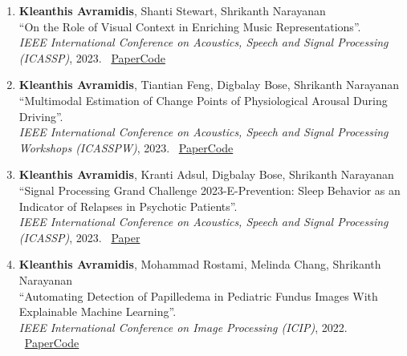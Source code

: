 \documentclass[margin]{res}
\begin{document}
\begin{resume}
\begin{enumerate}[leftmargin=*,itemsep=3pt]
\item \begin{minipage}[t]{\linewidth}\raggedright
    \textbf{Kleanthis Avramidis}, Shanti Stewart, Shrikanth Narayanan \\
    ``On the Role of Visual Context in Enriching Music Representations''. \\
    \textit{IEEE International Conference on Acoustics, Speech and Signal Processing (ICASSP)}, 2023. \ \href{https://ieeexplore.ieee.org/abstract/document/10094915/}{Paper}\enspace \href{https://github.com/klean2050/VCMR}{Code}
\end{minipage}

\item \begin{minipage}[t]{\linewidth}\raggedright
    \textbf{Kleanthis Avramidis}, Tiantian Feng, Digbalay Bose, Shrikanth Narayanan \\
    ``Multimodal Estimation of Change Points of Physiological Arousal During Driving''. \\
    \textit{IEEE International Conference on Acoustics, Speech and Signal Processing Workshops (ICASSPW)}, 2023. \ \href{https://ieeexplore.ieee.org/abstract/document/10193718/}{Paper}\enspace \href{https://github.com/usc-sail/ggs\_driving}{Code}
\end{minipage}

\item \begin{minipage}[t]{\linewidth}\raggedright
    \textbf{Kleanthis Avramidis}, Kranti Adsul, Digbalay Bose, Shrikanth Narayanan \\
    ``Signal Processing Grand Challenge 2023-E-Prevention: Sleep Behavior as an Indicator of Relapses in Psychotic Patients''. \\
    \textit{IEEE International Conference on Acoustics, Speech and Signal Processing (ICASSP)}, 2023. \ \href{https://ieeexplore.ieee.org/abstract/document/10096044/}{Paper}
\end{minipage}

\item \begin{minipage}[t]{\linewidth}\raggedright
    \textbf{Kleanthis Avramidis}, Mohammad Rostami, Melinda Chang, Shrikanth Narayanan \\
    ``Automating Detection of Papilledema in Pediatric Fundus Images With Explainable Machine Learning''. \\
    \textit{IEEE International Conference on Image Processing (ICIP)}, 2022. \ \href{https://ieeexplore.ieee.org/abstract/document/9897529/}{Paper}\enspace \href{https://github.com/klean2050/papilledema}{Code}
\end{minipage}


\end{enumerate}
\end{resume}
\end{document}
